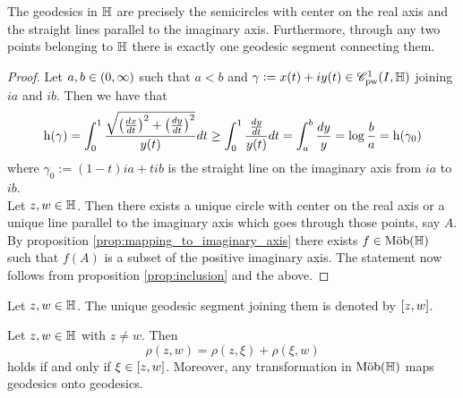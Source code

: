 \begin{theorem}
	The geodesics in $\mathbb{H}$ are precisely the semicircles with center on the real axis and the straight lines parallel to the imaginary axis. Furthermore, through any two points belonging to $\mathbb{H}$ there is exactly one geodesic segment connecting them. 
	\label{thm:geodesics}
\end{theorem}

\begin{proof}
	Let $a,b \in \intoo{0,\infty}$ such that $a < b$ and $\gamma := x(t) + iy(t) \in \mathscr{C}^1_{\mathrm{pw}}(I,\mathbb{H})$ joining $ia$ and $ib$. Then we have that
	\begin{equation*}
		\h(\gamma) =  \int_0^1 \frac{\sqrt{\del[1]{\frac{dx}{dt}}^2 + \del[1]{\frac{dy}{dt}}^2}}{y(t)} dt \geq  \int_0^1 \frac{\frac{dy}{dt}}{y(t)} dt = \int_a^b \frac{dy}{y} = \log \frac{b}{a} = \h(\gamma_0)
	\end{equation*}
	\noindent where $\gamma_0 := (1 - t)ia + tib$ is the straight line on the imaginary axis from $ia$ to $ib$.\\
	Let $z,w \in \mathbb{H}$. Then there exists a unique circle with center on the real axis or a unique line parallel to the imaginary axis which goes through those points, say $A$. By proposition \ref{prop:mapping_to_imaginary_axis} there exists $f \in \mathrm{M\ddot{o}b}(\mathbb{H})$ such that $f(A)$ is a subset of the positive imaginary axis. The statement now follows from proposition \ref{prop:inclusion} and the above.
\end{proof}

\begin{definition}
	Let $z,w \in \mathbb{H}$. The unique geodesic segment joining them is denoted by $\sbr[0]{z,w}$.
\end{definition}

\begin{corollary}
	Let $z,w \in \mathbb{H}$ with $z \neq w$. Then
	\begin{equation}
		\rho(z,w) = \rho(z,\xi) + \rho(\xi,w)
	\end{equation}
	\noindent holds if and only if $\xi \in \sbr[0]{z,w}$. Moreover, any transformation in $\mathrm{M\ddot{o}b}(\mathbb{H})$ maps geodesics onto geodesics.
\end{corollary}

